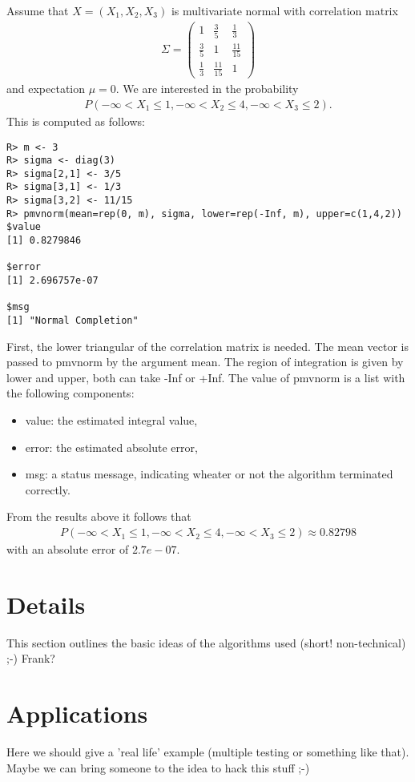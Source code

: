\documentclass[11pt]{amsart}
\begin{document}
Assume that $ X = (X_1, X_2, X_3) $ is multivariate normal with correlation
matrix
\begin{eqnarray*}
\Sigma = \left( \begin{array}{ccc} 1 & \frac{3}{5} & \frac{1}{3} \\
\frac{3}{5} & 1 & \frac{11}{15} \\
\frac{1}{3} & \frac{11}{15} & 1 \end{array} \right)
\end{eqnarray*}
and expectation $ \mu = 0 $. We are interested in the probability 
\begin{eqnarray*}
P(-\infty < X_1 \le 1, -\infty < X_2 \le 4, -\infty < X_3 \le 2). 
\end{eqnarray*}
This is computed as follows:
\begin{verbatim}
R> m <- 3
R> sigma <- diag(3)
R> sigma[2,1] <- 3/5
R> sigma[3,1] <- 1/3
R> sigma[3,2] <- 11/15
R> pmvnorm(mean=rep(0, m), sigma, lower=rep(-Inf, m), upper=c(1,4,2))
$value
[1] 0.8279846

$error
[1] 2.696757e-07

$msg
[1] "Normal Completion"
\end{verbatim}
First, the lower triangular of the correlation matrix is needed. The mean
vector is passed to pmvnorm by the argument {\ttfamily mean}. The region of
integration is given by {\ttfamily lower} and {\ttfamily upper}, both can
take {\ttfamily -Inf} or {\ttfamily +Inf}. The value of {\ttfamily pmvnorm}
is a list with the following components:
\begin{itemize}
\item {\ttfamily value}: the estimated integral value,
\item {\ttfamily error}: the estimated absolute error,
\item {\ttfamily msg}: a status message, indicating wheater or not the algorithm
terminated correctly.
\end{itemize}
From the results above it follows that
\begin{eqnarray*}
P(-\infty < X_1 \le 1, -\infty < X_2 \le 4, -\infty < X_3 \le 2) \approx
0.82798
\end{eqnarray*}
with an absolute error of $2.7e-07$. 

\section{Details}

This section outlines the basic ideas of the algorithms used (short!
non-technical) ;-) Frank?

\section{Applications}

Here we should give a 'real life' example (multiple testing or something
like that). Maybe we can bring someone to the idea to hack this stuff ;-)



\end{document}
